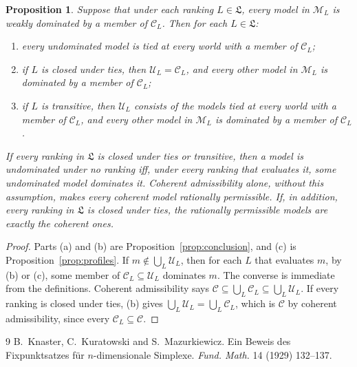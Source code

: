 \documentclass[11pt]{article}
\newtheorem{proposition}[theorem]{Proposition}
\theoremstyle{definition}
\newcommand{\M}{\mathcal M}
\newcommand{\C}{\mathcal C}
\newcommand{\U}{\mathcal U}
\newcommand{\Lf}{\mathfrak L}
\begin{document}
\begin{proposition}\label{prop:permissible}
Suppose that under each ranking $L\in\Lf$, every model in $\M_L$ is weakly dominated by a member of $\C_L$. Then for each $L\in\Lf$:
\begin{enumerate}[label=(\alph*)]
\item every undominated model is tied at every world with a member of $\C_L$;
\item if $L$ is closed under ties, then $\U_L=\C_L$, and every other model in $\M_L$ is dominated by a member of $\C_L$;
\item if $L$ is transitive, then $\U_L$ consists of the models tied at every world with a member of $\C_L$, and every other model in $\M_L$ is dominated by a member of $\C_L$.
\end{enumerate}
If every ranking in $\Lf$ is closed under ties or transitive, then a model is undominated under no ranking iff, under every ranking that evaluates it, some undominated model dominates it. Coherent admissibility alone, without this assumption, makes every coherent model rationally permissible. If, in addition, every ranking in $\Lf$ is closed under ties, the rationally permissible models are exactly the coherent ones.
\end{proposition}
\begin{proof}
Parts (a) and (b) are Proposition~\ref{prop:conclusion}, and (c) is Proposition~\ref{prop:profiles}. If $m\notin\bigcup_L\U_L$, then for each $L$ that evaluates $m$, by (b) or (c), some member of $\C_L\subseteq\U_L$ dominates $m$. The converse is immediate from the definitions. Coherent admissibility says $\C\subseteq\bigcup_L\C_L\subseteq\bigcup_L\U_L$. If every ranking is closed under ties, (b) gives $\bigcup_L\U_L=\bigcup_L\C_L$, which is $\C$ by coherent admissibility, since every $\C_L\subseteq\C$.
\end{proof}

\begin{thebibliography}{9}
 B.~Knaster, C.~Kuratowski and S.~Mazurkiewicz. Ein Beweis des Fixpunktsatzes f\"ur $n$-dimensionale Simplexe. \emph{Fund. Math.} 14 (1929) 132--137.
\end{thebibliography}
\end{document}

